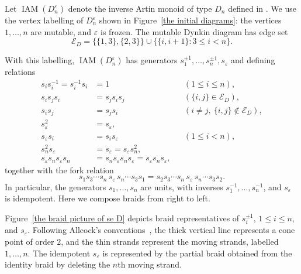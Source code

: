 \documentclass[a4paper, 12pt, reqno]{amsart}
\theoremstyle{definition}
\newcommand{\IAM}{\operatorname{IAM}}
\newcommand{\eps}{\varepsilon}
\begin{document}
Let $\IAM(D_n^\eps)$ denote the inverse Artin monoid of type $D_n$ defined in \cite[Definition~3.1]{Duan2025}. We use the vertex labelling of $D_n^\eps$ shown in Figure~\ref{the initial diagrams}: the vertices $1,\ldots,n$ are mutable, and $\eps$ is frozen. The mutable Dynkin diagram has edge set
\[
\mathcal{E}_D
=
\bigl\{\{1,3\},\{2,3\}\bigr\}
\cup
\bigl\{\{i,i+1\}:3\leq i<n\bigr\}.
\]

With this labelling, $\IAM(D_n^\eps)$ has generators $s_1^{\pm1},\ldots,s_n^{\pm1},s_\eps$ and defining relations
\[
\begin{aligned}
s_i s_i^{-1}=s_i^{-1}s_i&=1 && (1\leq i\leq n),\\
s_i s_j s_i&=s_j s_i s_j && (\{i,j\}\in\mathcal{E}_D),\\
s_i s_j&=s_j s_i && (i\ne j,\ \{i,j\}\notin\mathcal{E}_D),\\
s_\eps^2&=s_\eps,\\
s_\eps s_i&=s_i s_\eps && (1\leq i<n),\\
s_n^2 s_\eps&= s_\eps= s_\eps s_n^2,\\
s_\eps s_n s_\eps s_n&=s_n s_\eps s_n s_\eps= s_\eps s_n s_\eps,
\end{aligned}
\]
together with the fork relation
\[
s_1s_3\cdots s_n\, s_\eps\,s_n\cdots s_3s_1 = s_2s_3\cdots s_n\, s_\eps\,s_n\cdots s_3s_2.
\]
In particular, the generators $s_1,\ldots,s_n$ are units, with inverses $s_1^{-1},\ldots,s_n^{-1}$, and $s_\varepsilon$ is idempotent. Here we compose braids from right to left.


Figure~\ref{the braid picture of se D} depicts braid representatives of $s_i^{\pm1}$, $1\le i\le n$, and $s_\varepsilon$. Following Allcock's conventions~\cite{Allcock2002}, the thick vertical line represents a cone point of order $2$, and the thin strands represent the moving strands, labelled $1,\ldots,n$. The idempotent $s_\varepsilon$ is represented by the partial braid obtained from the identity braid by deleting the $n$th moving strand.
\end{document}
